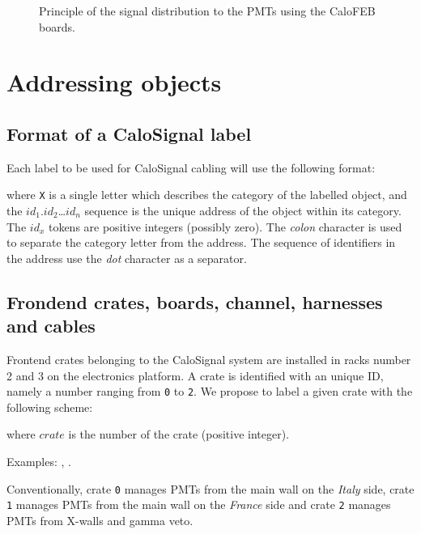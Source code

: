 \documentclass[12pt,a4paper]{article}
\newcommand{\pdftextimgpath}{./pdftex_t}
\begin{document}
\begin{figure}[h!]
  \begin{center}
    \scalebox{0.75}{}
  \end{center}
  \caption{Principle of the signal distribution  to the PMTs using the
    CaloFEB boards.}
  \label{fig:calosignal:principle:1}
\end{figure}

\clearpage
\section{Addressing objects}

\subsection{Format of a CaloSignal label}

Each label  to be used for  CaloSignal cabling will use  the following
format:

\begin{center}
\end{center}
\noindent  where \texttt{X}  is a  single letter  which describes  the
category  of the  labelled  object,  and the  $id_1$.$id_2$\dots$id_n$
sequence is the unique address of the object within its category.  The
$id_x$ tokens are positive integers (possibly zero).  The \emph{colon}
character is  used to separate  the category letter from  the address.
The  sequence  of  identifiers  in  the  address  use  the  \emph{dot}
character as a separator.


\subsection{Frondend crates, boards, channel, harnesses and cables}

Frontend crates  belonging to the  CaloSignal system are  installed in
racks  number  2 and  3  on  the  electronics  platform.  A  crate  is
identified with an unique ID,  namely a number ranging from \texttt{0}
to \texttt{2}.  We  propose to label a given crate  with the following
scheme:
\begin{center}
 \end{center}
where \texttt{$crate$} is the number of the crate (positive integer).
\vskip     10pt    \par\noindent     Examples:    ,
.   \par Conventionally,  crate \texttt{0}  manages
PMTs from  the main  wall on the  \emph{Italy} side,  crate \texttt{1}
manages PMTs  from the main wall  on the \emph{France} side  and crate
\texttt{2} manages PMTs from X-walls and gamma veto.
\end{document}
